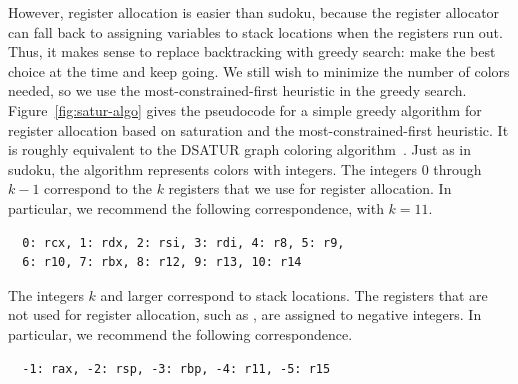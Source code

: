 \documentclass[7x10]{TimesAPriori_MIT}%
\numberwithin{theorem}{chapter}
\numberwithin{definition}{chapter}
\numberwithin{equation}{chapter}
\begin{document}
However, register allocation is easier than sudoku, because the
register allocator can fall back to assigning variables to stack
locations when the registers run out. Thus, it makes sense to replace
backtracking with greedy search: make the best choice at the time and
keep going. We still wish to minimize the number of colors needed, so
we use the most-constrained-first heuristic in the greedy search.
Figure~\ref{fig:satur-algo} gives the pseudocode for a simple greedy
algorithm for register allocation based on saturation and the
most-constrained-first heuristic. It is roughly equivalent to the
DSATUR graph coloring algorithm~\citep{Brelaz:1979eu}.  Just as in
sudoku, the algorithm represents colors with integers. The integers
$0$ through $k-1$ correspond to the $k$ registers that we use for
register allocation. In particular, we recommend the following
correspondence, with $k=11$.
\begin{lstlisting}
  0: rcx, 1: rdx, 2: rsi, 3: rdi, 4: r8, 5: r9,
  6: r10, 7: rbx, 8: r12, 9: r13, 10: r14
\end{lstlisting}
The integers $k$ and larger correspond to stack locations. The
registers that are not used for register allocation, such as
, are assigned to negative integers. In particular, we
recommend the following correspondence.
\begin{lstlisting}
  -1: rax, -2: rsp, -3: rbp, -4: r11, -5: r15
\end{lstlisting}


\end{document}

